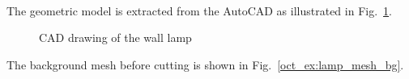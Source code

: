 \paragraph{}
The geometric model is extracted from the AutoCAD as illustrated in Fig.~\ref{oct_ex:lamp_cad}.
\begin{figure}[!ht]
    \centering
    \caption[CAD drawing of the wall lamp]{CAD drawing of the wall lamp}
    \label{oct_ex:lamp_cad}
\end{figure}
%
The background mesh before cutting is shown in Fig.~\ref{oct_ex:lamp_mesh_bg}.
